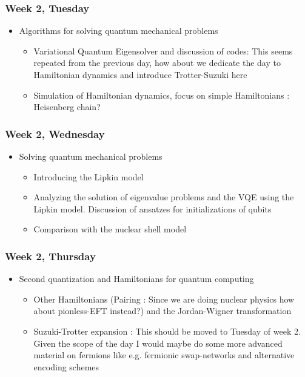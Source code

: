 \documentclass[twocolumn,superscriptaddress,amsmath,amssymb,
aps,floatfix]{revtex4-2}
\newcommand{\ale}[1]{{\color{blue}{\bf Ale}: #1}}
\begin{document}
    \subsubsection{Week 2, Tuesday}\label{week-2-tuesday}

\begin{itemize}
\item
  Algorithms for solving quantum mechanical problems

  \begin{itemize}
  \item
    Variational Quantum Eigensolver and discussion of codes\ale{This seems repeated from the previous day, how about we dedicate the day to Hamiltonian dynamics and introduce Trotter-Suzuki here}
  \item
    Simulation of Hamiltonian dynamics, focus on simple Hamiltonians \ale{Heisenberg chain?}
  \end{itemize}
\end{itemize}

    \subsubsection{Week 2, Wednesday}\label{week-2-wednesday}

\begin{itemize}
\item
  Solving quantum mechanical problems

  \begin{itemize}
  \item
    Introducing the Lipkin model
  \item
    Analyzing the solution of eigenvalue problems and the VQE using the
    Lipkin model. Discussion of ansatzes for initializations of qubits
  \item
    Comparison with the nuclear shell model
  \end{itemize}
\end{itemize}

    \subsubsection{Week 2, Thursday}\label{week-2-thursday}

\begin{itemize}
\item
  Second quantization and Hamiltonians for quantum computing

  \begin{itemize}
  \item
    Other Hamiltonians (Pairing \ale{Since we are doing nuclear physics how about pionless-EFT instead?}) and the Jordan-Wigner transformation
  \item
    Suzuki-Trotter expansion \ale{This should be moved to Tuesday of week 2. Given the scope of the day I would maybe do some more advanced material on fermions like e.g. fermionic swap-networks and alternative encoding schemes}
  \end{itemize}
\end{itemize}
\end{document}
